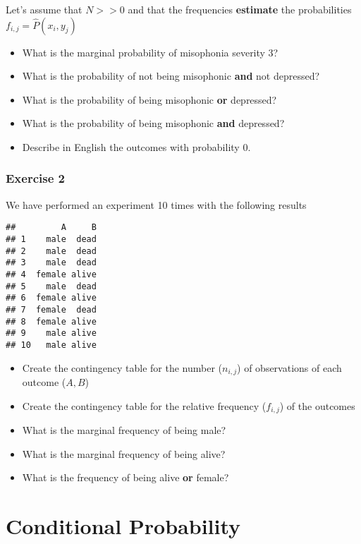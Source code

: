 \documentclass[
]{book}
\providecommand{\tightlist}{%
  \setlength{\itemsep}{0pt}\setlength{\parskip}{0pt}}
\begin{document}
Let's assume that \(N>>0\) and that the frequencies \textbf{estimate} the probabilities \(f_{i,j}=\hat{P}(x_i, y_j)\)

\begin{itemize}
\tightlist
\item
  What is the marginal probability of misophonia severity 3?
\item
  What is the probability of not being misophonic \textbf{and} not depressed?
\item
  What is the probability of being misophonic \textbf{or} depressed?
\item
  What is the probability of being misophonic \textbf{and} depressed?
\item
  Describe in English the outcomes with probability 0.
\end{itemize}

\hypertarget{exercise-2-1}{%
\subsubsection{Exercise 2}\label{exercise-2-1}}

We have performed an experiment 10 times with the following results

\begin{verbatim}
##         A     B
## 1    male  dead
## 2    male  dead
## 3    male  dead
## 4  female alive
## 5    male  dead
## 6  female alive
## 7  female  dead
## 8  female alive
## 9    male alive
## 10   male alive
\end{verbatim}

\begin{itemize}
\tightlist
\item
  Create the contingency table for the number (\(n_{i,j}\)) of observations of each outcome (\(A,B\))
\item
  Create the contingency table for the relative frequency (\(f_{i,j}\)) of the outcomes
\item
  What is the marginal frequency of being male?
\item
  What is the marginal frequency of being alive?
\item
  What is the frequency of being alive \textbf{or} female?
\end{itemize}

\hypertarget{conditional-probability-3}{%
\section{Conditional Probability}\label{conditional-probability-3}}
\end{document}

